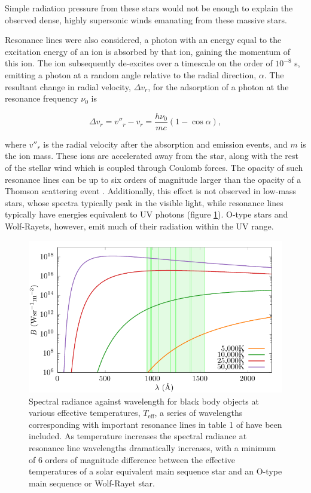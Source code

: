 Simple radiation pressure from these stars would not be enough to explain the observed dense, highly supersonic winds emanating from these massive stars.

Resonance lines were also considered, a photon with an energy equal to the excitation energy of an ion is absorbed by that ion, gaining the momentum of this ion.
The ion subsequently de-excites over a timescale on the order of $10^{-8}$ \si{\second}, emitting a photon at a random angle relative to the radial direction, $\alpha$. The resultant change in radial velocity, $\Delta v_r$, for the adsorption of a photon at the resonance frequency $\nu_0$ is

\begin{equation}
  \Delta v_r = v''_r - v_r = \frac{h\nu_0}{mc} (1-\cos\alpha),
\end{equation}

where $v''_r$ is the radial velocity after the absorption and emission events, and $m$ is the ion mass.
These ions are accelerated away from the star, along with the rest of the stellar wind which is coupled through Coulomb forces.
The opacity of such resonance lines can be up to six orders of magnitude larger than the opacity of a Thomson scattering event \parencite{lamersIntroductionStellarWinds1999}. Additionally, this effect is not observed in low-mass stars, whose spectra typically peak in the visible light, while resonance lines typically have energies equivalent to UV photons (figure \ref{fig:planck-comp}).
O-type stars and Wolf-Rayets, however, emit much of their radiation within the UV range.

\begin{figure}
  \centering
  \includegraphics{assets/plancks-law/plancks-law.pdf}
  \caption[Planck's law radiance comparison with resonance lines]{Spectral radiance against wavelength for black body objects at various effective temperatures, $T_{\text{eff}}$, a series of wavelengths corresponding with important resonance lines in table 1 of \cite{lucy_mass_1970} have been included. As temperature increases the spectral radiance at resonance line wavelengths dramatically increases, with a minimum of 6 orders of magnitude difference between the effective temperatures of a solar equivalent main sequence star and an O-type main sequence or Wolf-Rayet star.}
  \label{fig:planck-comp}
\end{figure}

